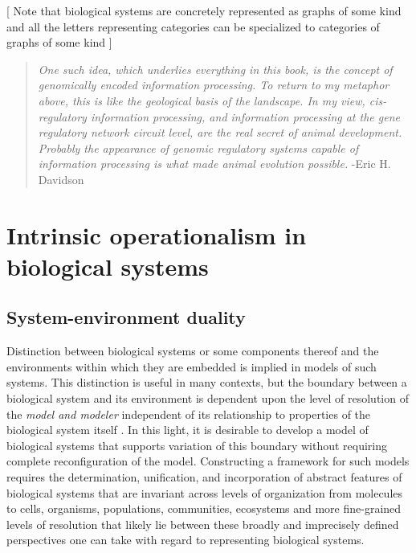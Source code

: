 \documentclass[aps,twocolumn]{revtex4-1}
\begin{document}
[ Note that biological systems are concretely represented as graphs of some kind and all the letters representing categories can be specialized to categories of graphs of some kind ]

\begin{quotation}
{\it One such idea, which underlies everything in this book, is the concept
of genomically encoded information processing. To return to my metaphor above,
this is like the geological basis of the landscape. In my view, cis-regulatory information processing, and information processing at the gene regulatory network circuit level, are the real secret of animal development. Probably the appearance of genomic regulatory systems capable of information processing is what made animal evolution possible.} -Eric H. Davidson \cite{Davidson2006a}
\end{quotation}

\section{Intrinsic operationalism in biological systems}
\subsection{System-environment duality}
Distinction between biological systems or some components thereof and the environments within which they are embedded is implied in models of such systems. This distinction is useful in many contexts, but the boundary between a biological system and its environment is dependent upon the level of resolution of the \emph{model and modeler} independent of its relationship to properties of the biological system itself \cite{Fontana1996}. In this light, it is desirable to develop a model of biological systems that supports variation of this boundary without requiring complete reconfiguration of the model. Constructing a framework for such models requires the determination, unification, and incorporation of abstract features of biological systems that are invariant across levels of organization from molecules to cells, organisms, populations, communities, ecosystems and more fine-grained levels of resolution that likely lie between these broadly and imprecisely defined perspectives one can take with regard to representing biological systems.
\end{document}
